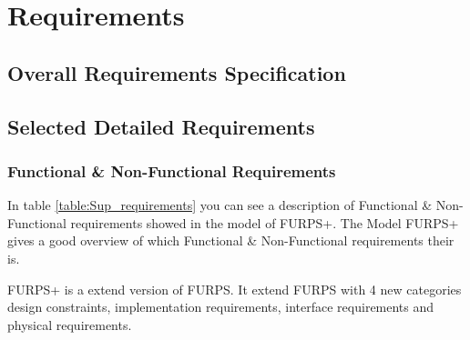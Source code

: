 \section{Requirements}

\subsection{Overall Requirements Specification}

\subsection{Selected Detailed Requirements}

\subsubsection{Functional \& Non-Functional Requirements}
In table \ref{table:Sup_requirements} you can see a description of Functional \&
Non-Functional requirements showed in the model of FURPS+. The Model FURPS+ 
gives a good overview of which Functional \& Non-Functional requirements their is.

FURPS+ is a extend version of FURPS. It extend FURPS with 4 new categories
design constraints, implementation requirements, interface requirements and 
physical requirements.

